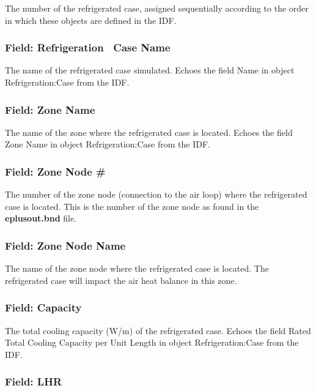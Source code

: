 The number of the refrigerated case, assigned sequentially according to the order in which these objects are defined in the IDF.

\subsubsection{Field: Refrigeration~ Case Name}\label{field-refrigeration-case-name}

The name of the refrigerated case simulated. Echoes the field Name in object Refrigeration:Case from the IDF.

\subsubsection{Field: Zone Name}\label{field-zone-name-12}

The name of the zone where the refrigerated case is located. Echoes the field Zone Name in object Refrigeration:Case from the IDF.

\subsubsection{Field: Zone Node \#}\label{field-zone-node}

The number of the zone node (connection to the air loop) where the refrigerated case is located. This is the number of the zone node as found in the \textbf{eplusout.bnd} file.

\subsubsection{Field: Zone Node Name}\label{field-zone-node-name}

The name of the zone node where the refrigerated case is located. The refrigerated case will impact the air heat balance in this zone.

\subsubsection{Field: Capacity}\label{field-capacity}

The total cooling capacity (W/m) of the refrigerated case. Echoes the field Rated Total Cooling Capacity per Unit Length in object Refrigeration:Case from the IDF.

\subsubsection{Field: LHR}\label{field-lhr}


